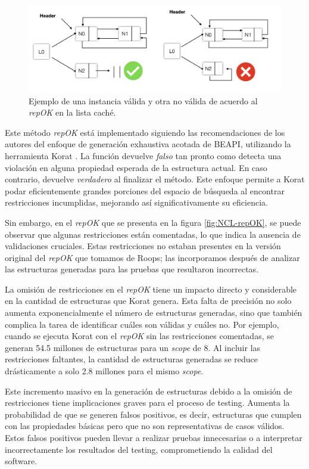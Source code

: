 \begin{figure}[H]
  \centering
  \includegraphics[scale=0.3]{images/repok3.jpg}
  \caption{Ejemplo de una instancia válida y otra no válida de acuerdo al \emph{repOK} en la lista caché.}
  \label{fig:repok3}
\end{figure}

Este método \emph{repOK} está implementado siguiendo las recomendaciones de los autores del enfoque de generación exhaustiva acotada de BEAPI, utilizando la herramienta \textsf{Korat} \cite{Boyapati02}. 
La función devuelve \emph{falso} tan pronto como detecta una violación en alguna propiedad esperada de la estructura actual. 
En caso contrario, devuelve \emph{verdadero} al finalizar el método. 
Este enfoque permite a \textsf{Korat} podar eficientemente grandes porciones del espacio de búsqueda al encontrar restricciones incumplidas, mejorando así significativamente su eficiencia.

Sin embargo, en el \emph{repOK} que se presenta en la figura \ref{fig:NCL-repOK}, 
se puede observar que algunas restricciones están comentadas, 
lo que indica la ausencia de validaciones cruciales. 
Estas restricciones no estaban presentes en la versión original del \emph{repOK} que tomamos de Roops; 
las incorporamos después de analizar las estructuras generadas para las pruebas que resultaron incorrectas.

La omisión de restricciones en el \emph{repOK} tiene un impacto directo y considerable en la cantidad de estructuras que \textsf{Korat} genera. 
Esta falta de precisión no solo aumenta exponencialmente el número de estructuras generadas, 
sino que también complica la tarea de identificar cuáles son válidas y cuáles no. 
Por ejemplo, cuando se ejecuta \textsf{Korat} con el \emph{repOK} sin las restricciones comentadas, 
se generan 54.5 millones de estructuras para un \emph{scope} de 8. Al incluir las restricciones faltantes, 
la cantidad de estructuras generadas se reduce drásticamente a solo 2.8 millones para el mismo \emph{scope}.

Este incremento masivo en la generación de estructuras debido a la omisión de restricciones tiene implicaciones graves para el proceso de testing. 
Aumenta la probabilidad de que se generen falsos positivos, es decir, estructuras que cumplen con las propiedades básicas pero que no son representativas de casos válidos. 
Estos falsos positivos pueden llevar a realizar pruebas innecesarias o a interpretar incorrectamente los resultados del testing, comprometiendo la calidad del software.

